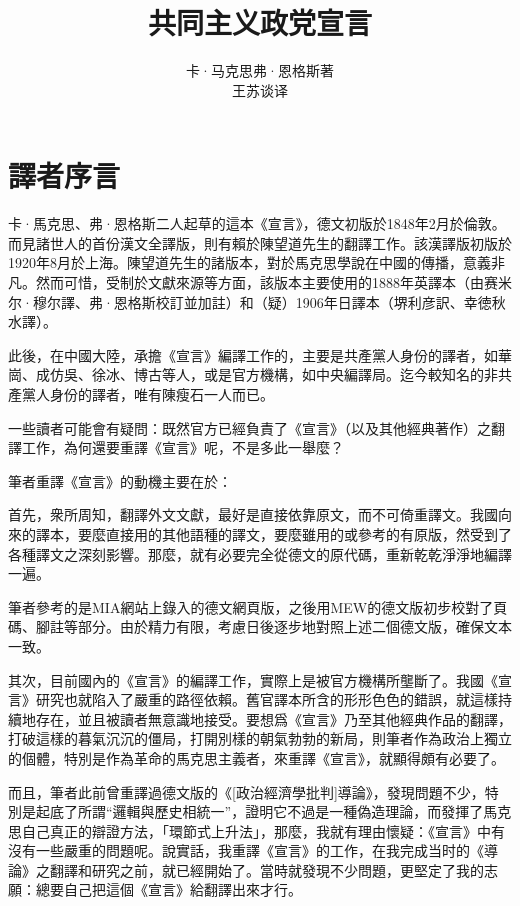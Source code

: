 \documentclass[a4paper,12pt]{ctexart}
\title{\marginpar{459}\Huge 共同主义政党宣言}
\author{卡·马克思\quad 弗·恩格斯著\\王苏谈译}
\date{}
\begin{document}
\maketitle
\thispagestyle{empty}
\newpage

\section{譯者序言}

卡·馬克思、弗·恩格斯二人起草的這本《宣言》，德文初版於1848年2月於倫敦。而見諸世人的首份漢文全譯版，則有賴於陳望道先生的翻譯工作。該漢譯版初版於1920年8月於上海。陳望道先生的諸版本，對於馬克思學說在中國的傳播，意義非凡。然而可惜，受制於文獻來源等方面，該版本主要使用的1888年英譯本（由赛米尔·穆尔譯、弗·恩格斯校訂並加註）和（疑）1906年日譯本（堺利彦訳、幸徳秋水譯）。

此後，在中國大陸，承擔《宣言》編譯工作的，主要是共產黨人身份的譯者，如華崗、成仿吳、徐冰、博古等人，或是官方機構，如中央編譯局。迄今較知名的非共產黨人身份的譯者，唯有陳瘦石一人而已。

一些讀者可能會有疑問：既然官方已經負責了《宣言》（以及其他經典著作）之翻譯工作，為何還要重譯《宣言》呢，不是多此一舉麼？

筆者重譯《宣言》的動機主要在於：

首先，衆所周知，翻譯外文文獻，最好是直接依靠原文，而不可倚重譯文。我國向來的譯本，要麼直接用的其他語種的譯文，要麼雖用的或參考的有原版，然受到了各種譯文之深刻影響。那麼，就有必要完全從德文的原代碼，重新乾乾淨淨地編譯一遍。

筆者參考的是MIA網站上錄入的德文網頁版，之後用MEW的德文版初步校對了頁碼、腳註等部分。由於精力有限，考慮日後逐步地對照上述二個德文版，確保文本一致。

其次，目前國內的《宣言》的編譯工作，實際上是被官方機構所壟斷了。我國《宣言》研究也就陷入了嚴重的路徑依賴。舊官譯本所含的形形色色的錯誤，就這樣持續地存在，並且被讀者無意識地接受。要想爲《宣言》乃至其他經典作品的翻譯，打破這樣的暮氣沉沉的僵局，打開別樣的朝氣勃勃的新局，則筆者作為政治上獨立的個體，特別是作為革命的馬克思主義者，來重譯《宣言》，就顯得頗有必要了。

而且，筆者此前曾重譯過德文版的《[政治經濟學批判]導論》，發現問題不少，特別是起底了所謂“邏輯與歷史相統一”，證明它不過是一種偽造理論，而發揮了馬克思自己真正的辯證方法，「環節式上升法」，那麼，我就有理由懷疑：《宣言》中有沒有一些嚴重的問題呢。說實話，我重譯《宣言》的工作，在我完成当时的《導論》之翻譯和研究之前，就已經開始了。當時就發現不少問題，更堅定了我的志願：總要自己把這個《宣言》給翻譯出來才行。
\end{document}
